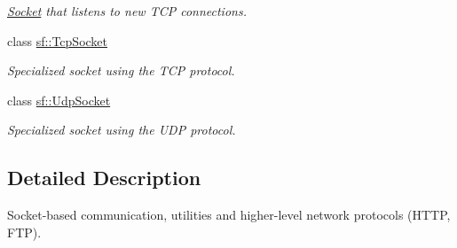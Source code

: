 \begin{DoxyCompactItemize}
\begin{DoxyCompactList}\small\item\em \mbox{\hyperlink{classsf_1_1_socket}{Socket}} that listens to new T\+CP connections. \end{DoxyCompactList}\item 
class \mbox{\hyperlink{classsf_1_1_tcp_socket}{sf\+::\+Tcp\+Socket}}
\begin{DoxyCompactList}\small\item\em Specialized socket using the T\+CP protocol. \end{DoxyCompactList}\item 
class \mbox{\hyperlink{classsf_1_1_udp_socket}{sf\+::\+Udp\+Socket}}
\begin{DoxyCompactList}\small\item\em Specialized socket using the U\+DP protocol. \end{DoxyCompactList}\end{DoxyCompactItemize}


\subsection{Detailed Description}
Socket-\/based communication, utilities and higher-\/level network protocols (H\+T\+TP, F\+TP). \begin{DoxyVerb}\end{DoxyVerb}
 